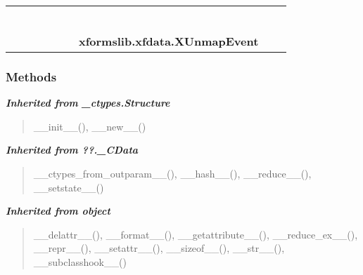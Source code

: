     \label{xformslib:xfdata:XUnmapEvent}
\begin{tabular}{cccccccccc}
\multicolumn{2}{r}{\settowidth{\BCL}{object}\multirow{2}{\BCL}{object}}
&&
&&
&&
  \\\cline{3-3}
  &&\multicolumn{1}{c|}{}
&&
&&
&&
  \\
\multicolumn{4}{r}{\settowidth{\BCL}{??.\_CData}\multirow{2}{\BCL}{??.\_CData}}
&&
&&
  \\\cline{5-5}
  &&&&\multicolumn{1}{c|}{}
&&
&&
  \\
\multicolumn{6}{r}{\settowidth{\BCL}{\_ctypes.Structure}\multirow{2}{\BCL}{\_ctypes.Structure}}
&&
  \\\cline{7-7}
  &&&&&&\multicolumn{1}{c|}{}
&&
  \\
&&&&&&\multicolumn{2}{l}{\textbf{xformslib.xfdata.XUnmapEvent}}
\end{tabular}



  \subsubsection{Methods}


\large{\textbf{\textit{Inherited from \_ctypes.Structure}}}

\begin{quote}
\_\_init\_\_(), \_\_new\_\_()
\end{quote}

\large{\textbf{\textit{Inherited from ??.\_CData}}}

\begin{quote}
\_\_ctypes\_from\_outparam\_\_(), \_\_hash\_\_(), \_\_reduce\_\_(), \_\_setstate\_\_()
\end{quote}

\large{\textbf{\textit{Inherited from object}}}

\begin{quote}
\_\_delattr\_\_(), \_\_format\_\_(), \_\_getattribute\_\_(), \_\_reduce\_ex\_\_(), \_\_repr\_\_(), \_\_setattr\_\_(), \_\_sizeof\_\_(), \_\_str\_\_(), \_\_subclasshook\_\_()
\end{quote}


